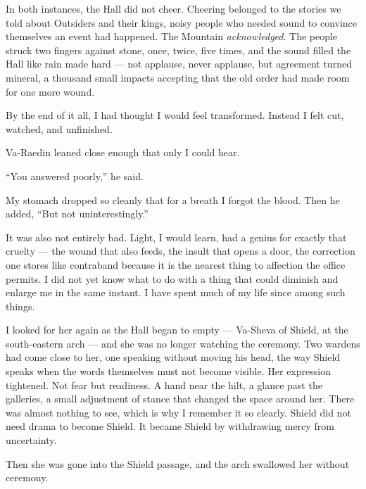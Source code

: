 In both instances, the Hall did not cheer.
Cheering belonged to the stories we told about Outsiders and their kings, noisy people who needed sound to convince themselves an event had happened. 
The Mountain \textit{acknowledged}.
The people struck two fingers against stone, once, twice, five times, and the sound filled the Hall like rain made hard --- not applause, never applause, but agreement 
turned mineral, a thousand small impacts accepting that the old order had made room for one more wound.\par

By the end of it all, I had thought I would feel transformed. Instead I felt cut, watched, and unfinished.\par

Va-Raedin leaned close enough that only I could hear.\par

``You answered poorly,'' he said.\par

My stomach dropped so cleanly that for a breath I forgot the blood. Then he added, ``But not uninterestingly.''\par

It was also not entirely bad. 
Light, I would learn, had a genius for exactly that cruelty --- the wound that also feeds, the insult that opens a door, the correction one stores like contraband because 
it is the nearest thing to affection the office permits. 
I did not yet know what to do with a thing that could diminish and enlarge me in the same instant. 
I have spent much of my life since among such things.\par

I looked for her again as the Hall began to empty --- Va-Sheva of Shield, at the south-eastern arch --- and she was no longer watching the ceremony. 
Two wardens had come close to her, one speaking without moving his head, the way Shield speaks when the words themselves must not become visible. 
Her expression tightened. 
Not fear but readiness. 
A hand near the hilt, a glance past the galleries, a small adjustment of stance that changed the space around her. 
There was almost nothing to see, which is why I remember it so clearly. 
Shield did not need drama to become Shield. 
It became Shield by withdrawing mercy from uncertainty.\par

Then she was gone into the Shield passage, and the arch swallowed her without ceremony.\par

